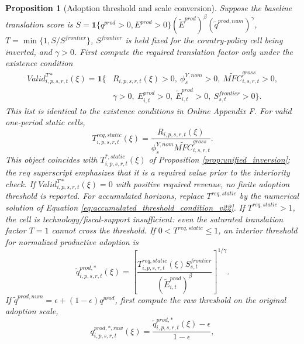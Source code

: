 \documentclass[11pt,a4paper]{article}
\newtheorem{proposition}{Proposition}
\begin{document}
\begin{proposition}[Adoption threshold and scale conversion]\label{prop:q_threshold_v10}
Suppose the baseline translation score is $S=\mathbf{1}\{q^{prod}>0,E^{prod}>0\}(\tilde E^{prod})^{\beta}(\tilde q^{prod,num})^{\gamma}$, $T=\min\{1,S/S^{frontier}\}$, $S^{frontier}$ is held fixed for the country-policy cell being inverted, and $\gamma>0$. First compute the required translation factor only under the existence condition
\begin{equation}\label{eq:valid_treq_theory_v20}
\begin{split}
    Valid^{T*}_{i,p,s,r,t}(\xi)=\mathbf{1}\{&R_{i,p,s,r,t}(\xi)>0,\ \phi^{Y,nom}_s>0,\ \widetilde{MFC}^{gross}_{i,s,r,t}>0,\\
    &\gamma>0,\ E^{prod}_{i,t}>0,\ \tilde E^{prod}_{i,t}>0,\ S^{frontier}_{s,t}>0\}.
\end{split}
\end{equation}
This list is identical to the existence conditions in Online Appendix F.
For valid one-period static cells,
\begin{equation}\label{eq:T_req_theory_v10}
    T^{req,static}_{i,p,s,r,t}(\xi)=\frac{R_{i,p,s,r,t}(\xi)}{\phi^{Y,nom}_s \widetilde{MFC}^{gross}_{i,s,r,t}}.
\end{equation}
This object coincides with $T^{*,static}_{i,p,s,r,t}(\xi)$ of Proposition \ref{prop:unified_inversion}; the $req$ superscript emphasizes that it is a required value prior to the interiority check. If $Valid^{T*}_{i,p,s,r,t}(\xi)=0$ with positive required revenue, no finite adoption threshold is reported. For accumulated horizons, replace $T^{req,static}$ by the numerical solution of Equation \eqref{eq:accumulated_threshold_condition_v22}. If $T^{req,static}>1$, the cell is technology/fiscal-support insufficient: even the saturated translation factor $T=1$ cannot cross the threshold. If $0<T^{req,static}\leq1$, an interior threshold for normalized productive adoption is
\begin{equation}\label{eq:qtilde_star_theory_v10}
    \tilde q^{prod,*}_{i,p,s,r,t}(\xi)=
    \left[
    \frac{T^{req,static}_{i,p,s,r,t}(\xi)S^{frontier}_{s,t}}
    {(\tilde E^{prod}_{i,t})^{\beta}}
    \right]^{1/\gamma}.
\end{equation}
If $\tilde q^{prod,num}=\epsilon+(1-\epsilon)q^{prod}$, first compute the raw threshold on the original adoption scale,
\begin{equation}\label{eq:q_star_original_scale_v10}
    q^{prod,*,raw}_{i,p,s,r,t}(\xi)=\frac{\tilde q^{prod,*}_{i,p,s,r,t}(\xi)-\epsilon}{1-\epsilon},

\end{equation}
\end{proposition}
\end{document}
